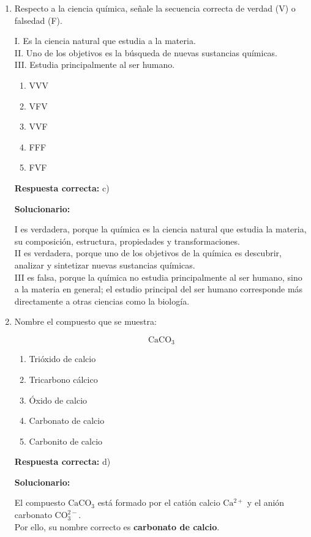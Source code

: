 \begin{enumerate}[resume]
	
	\item Respecto a la ciencia química, señale la secuencia correcta de verdad (V) o falsedad (F).
	
	I. Es la ciencia natural que estudia a la materia.\\
	II. Uno de los objetivos es la búsqueda de nuevas sustancias químicas.\\
	III. Estudia principalmente al ser humano.
	
	\begin{enumerate}[label=\alph*)]
		\item VVV
		\item VFV
		\item VVF
		\item FFF
		\item FVF
	\end{enumerate}
	\textbf{Respuesta correcta:} c)
	
	\vspace{2mm}
	\textbf{Solucionario:}
	
	I es verdadera, porque la química es la ciencia natural que estudia la materia, su composición, estructura, propiedades y transformaciones.\\
	II es verdadera, porque uno de los objetivos de la química es descubrir, analizar y sintetizar nuevas sustancias químicas.\\
	III es falsa, porque la química no estudia principalmente al ser humano, sino a la materia en general; el estudio principal del ser humano corresponde más directamente a otras ciencias como la biología.
	
	\vspace{6mm}
	
	\item Nombre el compuesto que se muestra:
	
	\[
	\mathrm{CaCO_3}
	\]
	
	\begin{enumerate}[label=\alph*)]
		\item Trióxido de calcio
		\item Tricarbono cálcico
		\item Óxido de calcio
		\item Carbonato de calcio
		\item Carbonito de calcio
	\end{enumerate}
	\textbf{Respuesta correcta:} d)
	
	\vspace{2mm}
	\textbf{Solucionario:}
	
	El compuesto \(\mathrm{CaCO_3}\) está formado por el catión calcio \(\mathrm{Ca^{2+}}\) y el anión carbonato \(\mathrm{CO_3^{2-}}\).\\
	Por ello, su nombre correcto es \textbf{carbonato de calcio}.
	
	\vspace{6mm}
	
\end{enumerate}







